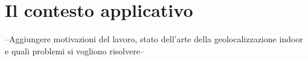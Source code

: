 \chapter{Il contesto applicativo}
--Aggiungere motivazioni del lavoro, stato dell’arte della geolocalizzazione indoor e quali problemi si vogliono risolvere-- \\